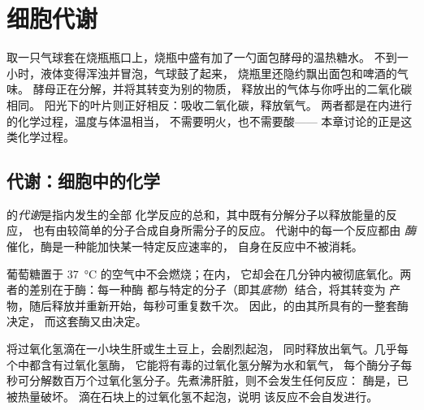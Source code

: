 \chapter{细胞代谢}\label{ch:g10:cell-metabolism}

取一只气球套在烧瓶瓶口上，烧瓶中盛有加了一勺面包酵母的温热糖水。
不到一小时，液体变得浑浊并冒泡，气球鼓了起来，
烧瓶里还隐约飘出面包和啤酒的气味。
酵母正在分解，并将其转变为别的物质，
释放出的气体与你呼出的二氧化碳相同。
阳光下的叶片则正好相反：吸收二氧化碳，释放氧气。
两者都是在内进行的化学过程，温度与体温相当，
不需要明火，也不需要酸——
本章讨论的正是这类化学过程。

\section{代谢：细胞中的化学}

\begin{definition}[代谢]\label{def:g10:cell-metabolism:metabolism}
的\emph{代谢}是指内发生的全部
化学反应的总和，其中既有分解分子以释放能量的反应，
也有由较简单的分子合成自身所需分子的反应。
代谢中的每一个反应都由
\emph{酶}催化，酶是一种能加快某一特定反应速率的，
自身在反应中不被消耗。
\end{definition}

\begin{proposition}[酶使细胞化学成为可能]\label{prop:g10:cell-metabolism:enzymes}
葡萄糖置于 \qty{37}{\celsius} 的空气中不会燃烧；在内，
它却会在几分钟内被彻底氧化。两者的差别在于酶：每一种酶
都与特定的分子（即其\emph{底物}）结合，将其转变为
产物，随后释放并重新开始，每秒可重复数千次。
因此，的由其所具有的一整套酶决定，
而这套酶又由决定。
\end{proposition}
\admitted

\begin{example}[一种酶的作用]\label{ex:g10:cell-metabolism:catalase}
将过氧化氢滴在一小块生肝或生土豆上，会剧烈起泡，
同时释放出氧气。几乎每个中都含有过氧化氢酶，
它能将有毒的过氧化氢分解为水和氧气，
每个酶分子每秒可分解数百万个过氧化氢分子。先煮沸肝脏，则不会发生任何反应：
酶是，已被热量破坏。
滴在石块上的过氧化氢不起泡，说明
该反应不会自发进行。
\end{example}

